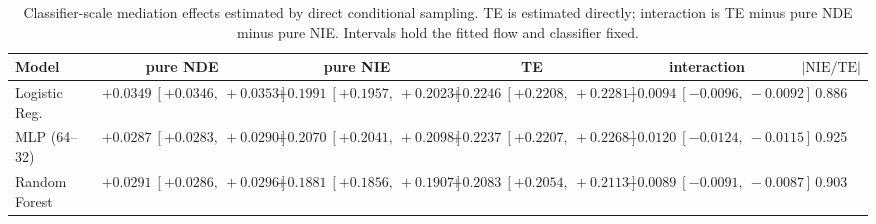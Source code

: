 \begin{table}[htbp]
  \centering
  \caption{Classifier-scale mediation effects estimated by direct conditional sampling. TE is estimated directly; interaction is TE minus pure NDE minus pure NIE. Intervals hold the fitted flow and classifier fixed.}
  \label{tab:german_synth_gap_overall}
  \begin{tabular}{lccccc}
    \toprule
    Model & pure NDE & pure NIE & TE & interaction & $|\mathrm{NIE}/\mathrm{TE}|$ \\
    \midrule
    Logistic Reg. & $+0.0349\ [+0.0346,\ +0.0353]$ & $+0.1991\ [+0.1957,\ +0.2023]$ & $+0.2246\ [+0.2208,\ +0.2281]$ & $-0.0094\ [-0.0096,\ -0.0092]$ & 0.886 \\
    MLP (64--32) & $+0.0287\ [+0.0283,\ +0.0290]$ & $+0.2070\ [+0.2041,\ +0.2098]$ & $+0.2237\ [+0.2207,\ +0.2268]$ & $-0.0120\ [-0.0124,\ -0.0115]$ & 0.925 \\
    Random Forest & $+0.0291\ [+0.0286,\ +0.0296]$ & $+0.1881\ [+0.1856,\ +0.1907]$ & $+0.2083\ [+0.2054,\ +0.2113]$ & $-0.0089\ [-0.0091,\ -0.0087]$ & 0.903 \\
    \bottomrule
  \end{tabular}
\end{table}